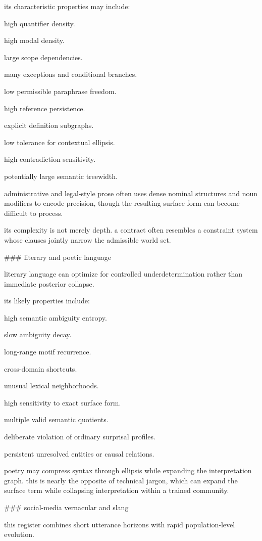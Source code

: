 its characteristic properties may include:

high quantifier density.

high modal density.

large scope dependencies.

many exceptions and conditional branches.

low permissible paraphrase freedom.

high reference persistence.

explicit definition subgraphs.

low tolerance for contextual ellipsis.

high contradiction sensitivity.

potentially large semantic treewidth.

administrative and legal-style prose often uses dense nominal structures and noun modifiers to encode precision, though the resulting surface form can become difficult to process.

its complexity is not merely depth. a contract often resembles a constraint system whose clauses jointly narrow the admissible world set.

### literary and poetic language

literary language can optimize for controlled underdetermination rather than immediate posterior collapse.

its likely properties include:

high semantic ambiguity entropy.

slow ambiguity decay.

long-range motif recurrence.

cross-domain shortcuts.

unusual lexical neighborhoods.

high sensitivity to exact surface form.

multiple valid semantic quotients.

deliberate violation of ordinary surprisal profiles.

persistent unresolved entities or causal relations.

poetry may compress syntax through ellipsis while expanding the interpretation graph. this is nearly the opposite of technical jargon, which can expand the surface term while collapsing interpretation within a trained community.

### social-media vernacular and slang

this register combines short utterance horizons with rapid population-level evolution.

